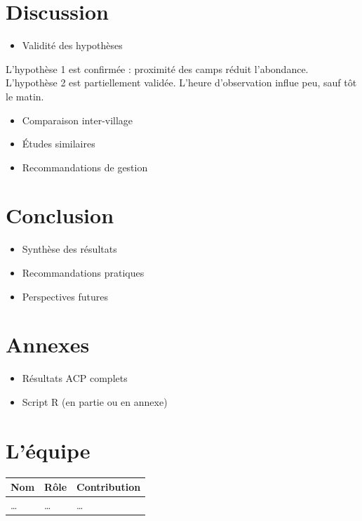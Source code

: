 \documentclass[
]{article}
\providecommand{\tightlist}{%
  \setlength{\itemsep}{0pt}\setlength{\parskip}{0pt}}
\begin{document}
\section{Discussion}\label{discussion}

\begin{itemize}
\tightlist
\item
  Validité des hypothèses
\end{itemize}

L'hypothèse 1 est confirmée : proximité des camps réduit l'abondance.
L'hypothèse 2 est partiellement validée.
L'heure d'observation influe peu, sauf tôt le matin.

\begin{itemize}
\tightlist
\item
  Comparaison inter-village
\item
  Études similaires
\item
  Recommandations de gestion
\end{itemize}

\section{Conclusion}\label{conclusion}

\begin{itemize}
\tightlist
\item
  Synthèse des résultats
\item
  Recommandations pratiques
\item
  Perspectives futures
\end{itemize}

\section{Annexes}\label{annexes}

\begin{itemize}
\tightlist
\item
  Résultats ACP complets
\item
  Script R (en partie ou en annexe)
\end{itemize}

\section{L'équipe}\label{luxe9quipe}

\begin{longtable}[]{@{}lll@{}}
\toprule\noalign{}
Nom & Rôle & Contribution \\
\midrule\noalign{}
\endhead
\bottomrule\noalign{}
\endlastfoot
\ldots{} & \ldots{} & \ldots{} \\
\end{longtable}
\end{document}
